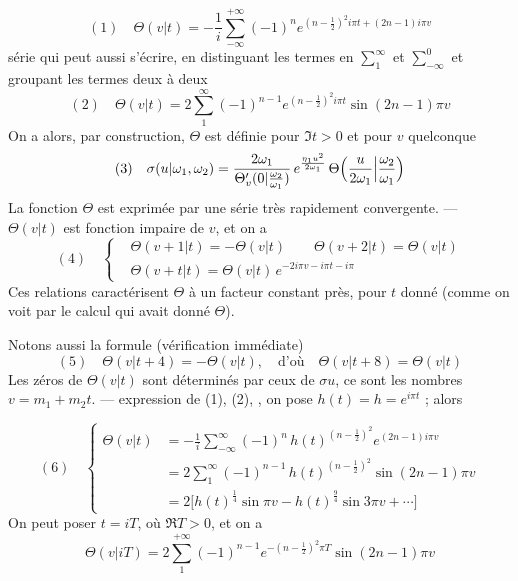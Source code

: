 \documentclass[11pt,a4paper]{article}
\begin{document}
\[
(1)\quad \Theta(v|t) = -\frac{1}{i}\sum_{-\infty}^{+\infty}(-1)^n
e^{(n-\frac{1}{2})^2 i\pi t + (2n-1)i\pi v}
\]
série qui peut aussi s'écrire, en  distinguant les termes en
$\sum_1^\infty$ et $\sum_{-\infty}^{0}$ et groupant les termes deux à deux
\[
(2)\quad \Theta(v|t) = 2\sum_{1}^{\infty}(-1)^{n-1} e^{(n-\frac{1}{2})^2 i\pi t}
\sin(2n-1)\pi v
\]
On a alors, par construction, $\Theta$ est définie  pour
$\Im t > 0$ et pour $v$ quelconque
\[
(3)\quad \sigma(u|\omega_1,\omega_2) = \frac{2\omega_1}{\Theta'_v(0|\frac{\omega_2}{\omega_1})}\,
e^{\frac{\eta_1 u^2}{2\omega_1}}\,\Theta\Bigl(\frac{u}{2\omega_1}\Big|\frac{\omega_2}{\omega_1}\Bigr)
\]
La fonction $\Theta$ est exprimée par une série très rapidement convergente. ---
$\Theta(v|t)$ est fonction impaire de $v$, et on a
\[
(4)\quad \left\lbrace
\begin{aligned}
&\Theta(v+1|t) = -\Theta(v|t) \qquad \Theta(v+2|t) = \Theta(v|t)\\
&\Theta(v+t|t) = \Theta(v|t)\, e^{-2i\pi v - i\pi t - i\pi}
\end{aligned}
\right.
\]
Ces relations caractérisent $\Theta$ à un facteur constant près, pour $t$ donné
(comme on voit par le calcul qui avait donné $\Theta$).

Notons aussi la formule (vérification immédiate)
\[
(5)\quad \Theta(v|t+4) = -\Theta(v|t), \quad\text{d'où}\quad \Theta(v|t+8) = \Theta(v|t)
\]
Les zéros de $\Theta(v|t)$ sont déterminés par ceux de $\sigma u$, ce sont les
nombres $v = m_1 + m_2 t$. ---  expression de (1), (2), , on pose  $h(t) = h = e^{i\pi t}$ ; alors

\[
(6)\quad \left\lbrace
\begin{aligned}
\Theta(v|t) &= -\frac{1}{i}\sum_{-\infty}^{\infty}(-1)^n\, h(t)^{(n-\frac12)^2}
e^{(2n-1)i\pi v}\\
&= 2\sum_{1}^{\infty}(-1)^{n-1}\, h(t)^{(n-\frac12)^2}\sin(2n-1)\pi v\\
&= 2\bigl[h(t)^{\frac14}\sin\pi v - h(t)^{\frac94}\sin 3\pi v + \cdots\bigr]
\end{aligned}
\right.
\]
On peut poser $t = iT$, où $\Re T > 0$, et on a
\[
\Theta(v|iT) = 2\sum_{1}^{+\infty}(-1)^{n-1} e^{-(n-\frac12)^2\pi T}\sin(2n-1)\pi v
\]
\end{document}
